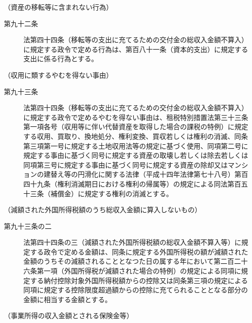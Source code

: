 \documentclass[twocolumn,a4j,10pt]{ltjtarticle}
\begin{document}
\noindent\hspace{10pt}（資産の移転等に含まれない行為）
\begin{description}
\item[第九十二条]法第四十四条（移転等の支出に充てるための交付金の総収入金額不算入）に規定する政令で定める行為は、第百八十一条（資本的支出）に規定する支出に係る行為とする。
\end{description}
\noindent\hspace{10pt}（収用に類するやむを得ない事由）
\begin{description}
\item[第九十三条]法第四十四条（移転等の支出に充てるための交付金の総収入金額不算入）に規定する政令で定めるやむを得ない事由は、租税特別措置法第三十三条第一項各号（収用等に伴い代替資産を取得した場合の課税の特例）に規定する収用、買取り、換地処分、権利変換、買収若しくは権利の消滅、同条第三項第一号に規定する土地収用法等の規定に基づく使用、同項第二号に規定する事由に基づく同号に規定する資産の取壊し若しくは除去若しくは同項第三号に規定する事由に基づく同号に規定する資産の除却又はマンションの建替え等の円滑化に関する法律（平成十四年法律第七十八号）第百四十九条（権利消滅期日における権利の帰属等）の規定による同法第百五十三条（補償金）に規定する権利の消滅とする。
\end{description}
\noindent\hspace{10pt}（減額された外国所得税額のうち総収入金額に算入しないもの）
\begin{description}
\item[第九十三条の二]法第四十四条の三（減額された外国所得税額の総収入金額不算入等）に規定する政令で定める金額は、同条に規定する外国所得税の額が減額された金額のうちその減額されることとなつた日の属する年において第二百二十六条第一項（外国所得税が減額された場合の特例）の規定による同項に規定する納付控除対象外国所得税額からの控除又は同条第三項の規定による同項に規定する控除限度超過額からの控除に充てられることとなる部分の金額に相当する金額とする。
\end{description}
\noindent\hspace{10pt}（事業所得の収入金額とされる保険金等）
\end{document}
